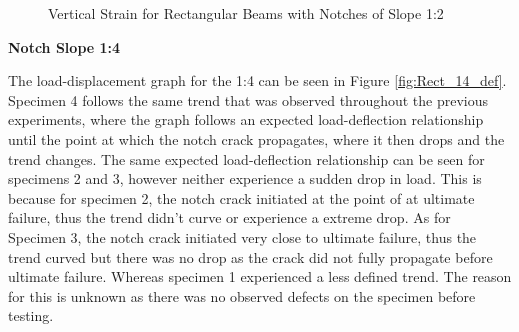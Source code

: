 \documentclass[11pt,a4paper]{article}
\numberwithin{equation}{subsection}
\begin{document}
\begin{figure}[h]
	\begin{center}
	\end{center}
	\caption{Vertical Strain for Rectangular Beams with Notches of Slope 1:2}
	\label{fig:Rect_12_Y}
\end{figure}

\vspace*{\baselineskip}

\noindent
\textbf{Notch Slope 1:4}\par
\noindent
The load-displacement graph for the 1:4 can be seen in Figure \ref{fig:Rect_14_def}. Specimen 4 follows the same trend that was observed throughout the previous experiments, where the graph follows an expected load-deflection relationship until the point at which the notch crack propagates, where it then drops and the trend changes. The same expected load-deflection relationship can be seen for specimens 2 and 3, however neither experience a sudden drop in load. This is because for specimen 2, the notch crack initiated at the point of at ultimate failure, thus the trend didn't curve or experience a extreme drop. As for Specimen 3, the notch crack initiated very close to ultimate failure, thus the trend curved but there was no drop as the crack did not fully propagate before ultimate failure. Whereas specimen 1 experienced a less defined trend. The reason for this is unknown as there was no observed defects on the specimen before testing.

\vspace*{\baselineskip}
\end{document}
